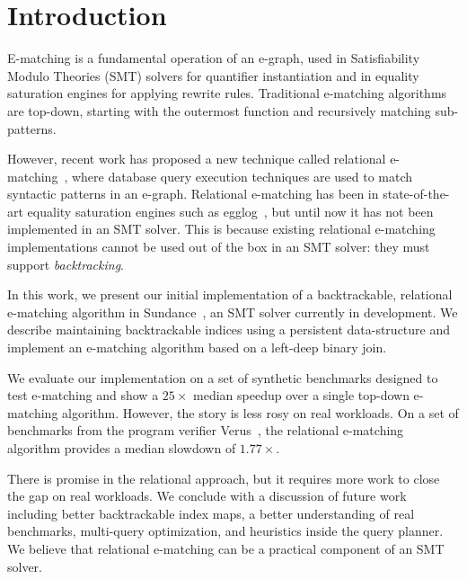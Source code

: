 \section{Introduction}
\label{sec:intro}

E-matching is a fundamental operation of an e-graph, used in Satisfiability
Modulo Theories (SMT) solvers for quantifier instantiation and in equality
saturation engines for applying rewrite rules. Traditional e-matching algorithms
are top-down, starting with the outermost function and recursively matching
sub-patterns.

However, recent work has proposed a new technique called relational
e-matching~\cite{relationalematching}, where database query execution techniques
are used to match syntactic patterns in an e-graph. Relational e-matching has
been  in state-of-the-art equality saturation engines such as
egglog~\cite{egglog}, but until now it has not been implemented in an SMT solver.
This is because existing relational e-matching implementations cannot be used
out of the box in an SMT solver: they must support \emph{backtracking}.

In this work, we present our initial implementation of a backtrackable,
relational e-matching algorithm in Sundance~\cite{sundance}, an SMT solver currently in
development. We describe maintaining backtrackable indices using a persistent 
data-structure and implement an e-matching algorithm based on a
left-deep binary join.

We evaluate our implementation on a set of synthetic benchmarks designed to test
e-matching and show a $25 \times$ median speedup over a single top-down
e-matching algorithm. However, the story is less rosy on real workloads. On a
set of benchmarks from the program verifier Verus~\cite{verus}, the relational
e-matching algorithm provides a median slowdown of $1.77 \times$. 

There is promise in the relational approach, but it requires more work to close
the gap on real workloads. We conclude with a discussion of future work
including better backtrackable index maps, a better understanding of real
benchmarks, multi-query optimization, and heuristics inside the query
planner. We believe that relational e-matching can be a practical component of
an SMT solver.
